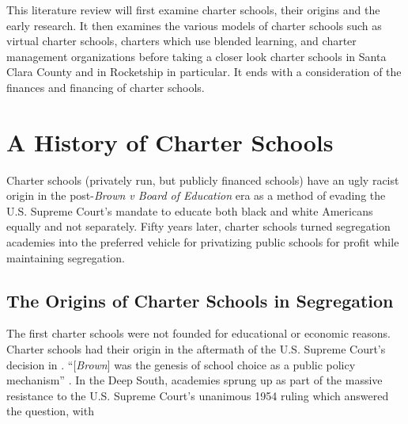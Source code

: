 This literature review will first examine charter schools, their origins and the early research. It then examines the various models of charter schools such as virtual charter schools, charters which use blended learning, and charter management organizations before taking a closer look charter schools in Santa Clara County and in Rocketship in particular. It ends with a consideration of the finances and financing of charter schools.

\section{A History of Charter Schools}\label{sec:cs-history}\indent

Charter schools (privately run, but publicly financed schools) have an ugly racist origin in the post-\textit{Brown v Board of Education} era as a method of evading the U.S. Supreme Court's mandate to educate both black and white Americans equally and not separately. Fifty years later, charter schools turned segregation academies into the preferred vehicle for privatizing public schools for profit while maintaining segregation.

\subsection{The Origins of Charter Schools in Segregation}\label{sec:origins}\indent

The first charter schools were not founded for educational or economic reasons. Charter schools had their origin in the aftermath of the U.S. Supreme Court's decision in . ``[\textit{Brown}] was the genesis of school choice as a public policy mechanism'' \parencite[8]{Garcia2018}. In the Deep South, academies sprung up as part of the massive resistance to the U.S. Supreme Court's unanimous 1954 ruling which answered the question,
with  %

